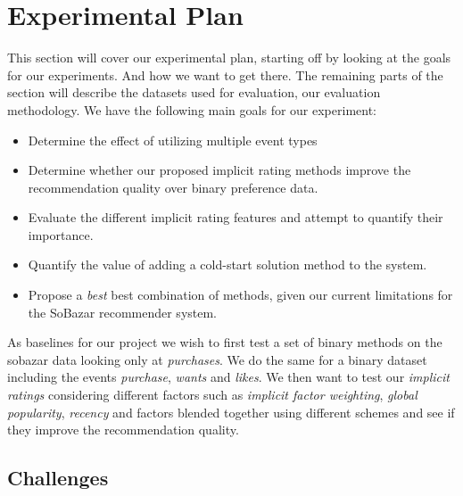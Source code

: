 \clearpage
\section{Experimental Plan}
\label{sec:experimental-plan}


This section will cover our experimental plan, starting off by looking at the
goals for our experiments. And how we want to get there. The remaining parts of
the section will describe the datasets used for evaluation, our evaluation methodology.
We have the following main goals for our experiment:

\begin{itemize}
	\item Determine the effect of utilizing multiple event types
	\item Determine whether our proposed implicit rating methods improve the recommendation quality over
	binary preference data.
	\item Evaluate the different implicit rating features and attempt to quantify their importance.
	\item Quantify the value of adding a cold-start solution method to the system.
	\item Propose a \emph{best} best combination of methods, given our current limitations for the SoBazar recommender system.
\end{itemize}

As baselines for our project we wish to first test a set of binary methods on the sobazar data
looking only at \emph{purchases}. We do the same for a binary dataset including the events
\emph{purchase}, \emph{wants} and \emph{likes}. We then want to test our \emph{implicit ratings}
considering different factors such as \emph{implicit factor weighting}, \emph{global popularity},
\emph{recency} and factors blended together using different schemes and see if they improve the
recommendation quality.

\subsection{Challenges}

